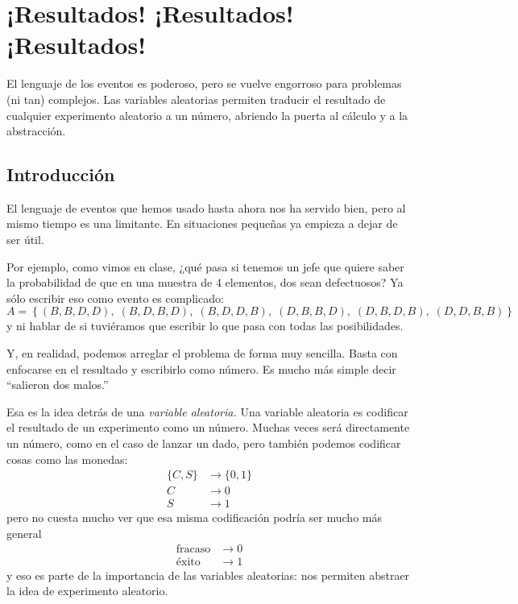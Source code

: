 \chapter{¡Resultados! ¡Resultados! ¡Resultados!} 

\begin{ideanote}
El lenguaje de los eventos es poderoso, pero se vuelve engorroso para problemas (ni tan) complejos. Las variables aleatorias permiten traducir el resultado de cualquier experimento aleatorio a un número, abriendo la puerta al cálculo y a la abstracción.
\end{ideanote}

\section{Introducción}

El lenguaje de eventos que hemos usado hasta ahora nos ha servido bien, pero al mismo tiempo es una limitante. En situaciones pequeñas ya empieza a dejar de ser útil.

Por ejemplo, como vimos en clase, ¿qué pasa si tenemos un jefe que quiere saber la probabilidad de que en una muestra de 4 elementos, dos sean defectuosos? Ya sólo escribir eso como evento es complicado:
\[A=\left\{
 (B, B, D, D),\;
 (B, D, B, D),\;
 (B, D, D, B),\;
 (D, B, B, D),\;
 (D, B, D, B),\;
 (D, D, B, B)
\right\}\]
y ni hablar de si tuviéramos que escribir lo que pasa con todas las posibilidades.

Y, en realidad, podemos arreglar el problema de forma muy sencilla. Basta con enfocarse en el resultado y escribirlo como número. Es mucho más simple decir \enquote{salieron dos malos.}

Esa es la idea detrás de una \emph{variable aleatoria.} Una variable aleatoria es codificar el resultado de un experimento como un número. Muchas veces será directamente un número, como en el caso de lanzar un dado, pero también podemos codificar cosas como las monedas:
\begin{align*}
    \{C, S\} &\to \{0, 1\}\\
    C &\to 0\\
    S &\to 1
\end{align*}
pero no cuesta mucho ver que esa misma codificación podría ser mucho más general
\begin{align*}
    \text{fracaso} &\to 0\\
    \text{éxito} &\to 1
\end{align*}
y eso es parte de la importancia de las variables aleatorias: nos permiten abstraer la idea de experimento aleatorio.

